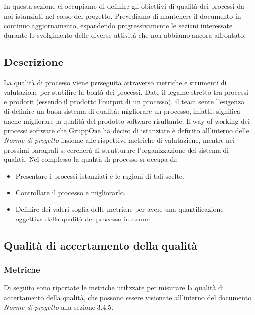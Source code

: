 \documentclass[../piano-di-qualifica.tex]{subfiles}
\begin{document}
In questa sezione ci occupiamo di definire gli obiettivi di qualità dei processi da noi istanziati nel corso del progetto.
Prevediamo di mantenere il documento in continuo aggiornamento, espandendo progressivamente le sezioni interessate durante lo svolgimento delle diverse attività che non abbiamo ancora affrontato.

\subsection{Descrizione}%
\label{sub:descrizione}

La qualità di processo viene perseguita attraverso metriche e strumenti di valutazione per stabilire la bontà dei processi.
Dato il legame stretto tra processi e prodotti (essendo il prodotto l`output di un processo), il team sente l'esigenza di definire un buon sistema di qualità: migliorare un processo, infatti, significa anche migliorare la qualità del prodotto software risultante.
Il way of working dei processi software che GruppOne ha deciso di istanziare è definito all'interno delle \textit{Norme di progetto} insieme alle rispettive metriche di valutazione, mentre nei prossimi paragrafi si cercherà di strutturare l'organizzazione del sistema di qualità.
Nel complesso la qualità di processo si occupa di:
\begin{itemize}
  \item Presentare i processi istanziati e le ragioni di tali scelte.
  \item Controllare il processo e migliorarlo.
  \item Definire dei valori soglia delle metriche per avere una quantificazione oggettiva della qualità del processo in esame.
\end{itemize}


\subsection{Qualità di accertamento della qualità}%
\label{subsec:qualita_accertamento_qualita}

\subsubsection{Metriche}%
\label{subsec:metriche_aq}
Di seguito sono riportate le metriche utilizzate per misurare la qualità di accertamento della qualità, che possono essere visionate all'interno del documento \textit{Norme di progetto} alla sezione 3.4.5.
\end{document}
